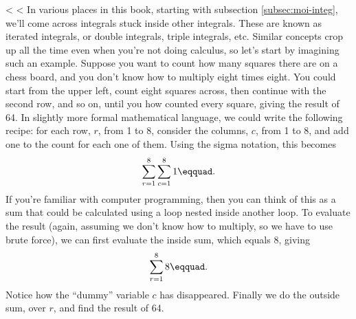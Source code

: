 <%
<%
In various places in this book, starting with subsection \ref{subsec:moi-integ},
we'll come across integrals stuck inside other integrals. These are known as
iterated integrals, or double integrals, triple integrals, etc. Similar concepts
crop up all the time even when you're not doing calculus, so let's start by
imagining such an example. Suppose you want to count how many squares there are
on a chess board, and you don't know how to multiply eight times eight. You
could start from the upper left, count eight squares across, then continue with
the second row, and so on, until you how counted every square, giving the result
of 64. In slightly more formal mathematical language, we could write the following
recipe: for each row, $r$, from 1 to 8, consider the columns, $c$, from 1 to 8,
and add one to the count for each one of them. Using the sigma notation, this
becomes
\begin{equation*}
  \sum_{r=1}^8 \sum_{c=1}^8 1\eqquad.
\end{equation*}
If you're familiar with computer programming, then you can think of this as
a sum that could be calculated using a loop nested inside another loop.
To evaluate the result (again, assuming we don't know how to multiply, so we
have to use brute force), we can first evaluate the inside sum, which equals
8, giving
\begin{equation*}
  \sum_{r=1}^8 8\eqquad.
\end{equation*}
Notice how the ``dummy'' variable $c$ has disappeared. Finally we do the outside
sum, over $r$, and find the result of 64.

